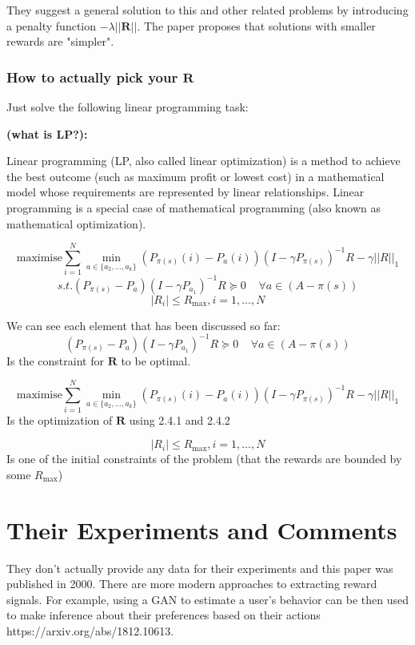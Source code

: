 \documentclass{article}
\begin{document}
    They suggest a general solution to this and other related problems by introducing a penalty function $-\lambda ||\mathbf{R}||$. The paper proposes that solutions with smaller rewards are "simpler".

    


    \subsubsection{How to actually pick your $\mathbf{R}$}

    Just solve the following linear programming task:

    \textbf{(what is LP?):}

    Linear programming (LP, also called linear optimization) is a method to achieve the best outcome (such as maximum profit or lowest cost) in a mathematical model whose requirements are represented by linear relationships. Linear programming is a special case of mathematical programming (also known as mathematical optimization). 

    $$\text{maximise} \sum_{i=1}^N \min_{a \in \{ a_2, \dots, a_k \}} (P_{\pi(s)}(i)- P_a(i)) (I - \gamma P_{\pi(s)})^{-1} R - \gamma ||R||_1$$
    $$s.t. (P_{\pi(s)} - P_a)(I - \gamma P_{a_1})^{-1} R \succeq 0 \;\;\;\; \forall a \in (A - \pi(s)) $$
    $$|R_i| \le R_{\max}, i = 1, \dots, N$$

    We can see each element that has been discussed so far:
    $$(P_{\pi(s)} - P_a)(I - \gamma P_{a_1})^{-1} R \succeq 0 \;\;\;\; \forall a \in (A - \pi(s)) $$
    Is the constraint for $\mathbf{R}$ to be optimal. 

    $$\text{maximise} \sum_{i=1}^N \min_{a \in \{ a_2, \dots, a_k \}} (P_{\pi(s)}(i)- P_a(i)) (I - \gamma P_{\pi(s)})^{-1} R - \gamma ||R||_1$$
    Is the optimization of $\mathbf{R}$ using 2.4.1 and 2.4.2
    
    $$|R_i| \le R_{\max}, i = 1, \dots, N$$
    Is one of the initial constraints of the problem (that the rewards are bounded by some $R_{\max}$)



    \section{Their Experiments and Comments}

    They don't actually provide any data for their experiments and this paper was published in 2000. There are more modern approaches to extracting reward signals. For example, using a GAN to estimate a user's behavior can be then used to make inference about their preferences based on their actions https://arxiv.org/abs/1812.10613.
\end{document}
